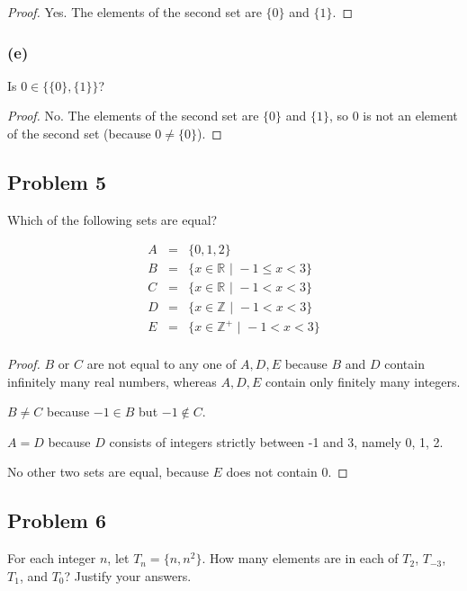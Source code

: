 \documentclass[14pt]{extarticle}
\newcommand{\R}{\mathbb{R}}
\newcommand{\Z}{\mathbb{Z}}
\begin{document}
\begin{proof}
    Yes. The elements of the second set are $\{0\}$ and $\{1\}$.
\end{proof}

\subsubsection{(e)}
Is $0 \in \{\{0\}, \{1\}\}$?

\begin{proof}
    No. The elements of the second set are $\{0\}$ and $\{1\}$, so 0 is not an
    element of the second set (because $0 \neq \{0\}$).
\end{proof}

\subsection{Problem 5}
Which of the following sets are equal?

$$
    \begin{array}{ccl}
        A & = & \{0, 1, 2\}                            \\
        B & = & \{x \in \R \,\, | \,\, -1 \leq x < 3\} \\
        C & = & \{x \in \R \,\, | \,\, -1 < x < 3\}    \\
        D & = & \{x \in \Z \,\, | \,\, -1 < x < 3\}    \\
        E & = & \{x \in \Z^+ \,\, | \,\, -1 < x < 3\}  \\
    \end{array}
$$

\begin{proof}
    $B$ or $C$ are not equal to any one of $A, D, E$ because $B$ and $D$ contain
    infinitely many real numbers, whereas $A, D, E$ contain only finitely many
    integers.

    $B \neq C$ because $-1 \in B$ but $-1 \notin C$.

    $A = D$ because $D$ consists of integers strictly between -1 and 3, namely 0, 1,
    2.

    No other two sets are equal, because $E$ does not contain 0.
\end{proof}

\subsection{Problem 6}
For each integer $n$, let $T_n = \{n, n^2\}$. How many elements are in each of
$T_2$, $T_{-3}$, $T_1$, and $T_0$? Justify your answers.
\end{document}
